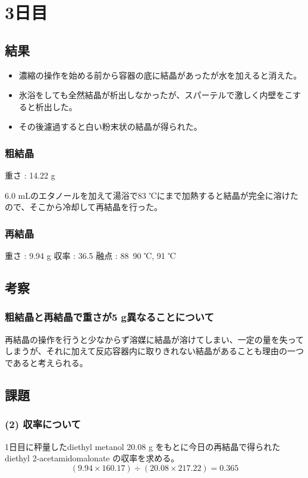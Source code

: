 

\section*{3日目}

\subsection*{結果}
\begin{itemize}
\item 濃縮の操作を始める前から容器の底に結晶があったが水を加えると消えた。
\item 氷浴をしても全然結晶が析出しなかったが、スパーテルで激しく内壁をこすると析出した。
\item その後濾過すると白い粉末状の結晶が得られた。

\end{itemize}
\subsubsection*{粗結晶}
重さ : 14.22 g

6.0 mLのエタノールを加えて湯浴で83 ℃にまで加熱すると結晶が完全に溶けたので、そこから冷却して再結晶を行った。

\subsubsection*{再結晶}
重さ : 9.94 g
収率 : 36.5 %
融点 : 88~90 ℃, 91 ℃

\subsection*{考察}
\subsubsection*{粗結晶と再結晶で重さが5 g異なることについて}
再結晶の操作を行うと少なからず溶媒に結晶が溶けてしまい、一定の量を失ってしまうが、それに加えて反応容器内に取りきれない結晶があることも理由の一つであると考えられる。

\subsection*{課題}
\subsubsection*{(2) 収率について}
1日目に秤量したdiethyl metanol 20.08 g をもとに今日の再結晶で得られたdiethyl 2-acetamidomalonate の収率を求める。
\[(9.94 \times 160.17) \div (20.08 \times 217.22) = 0.365\]


